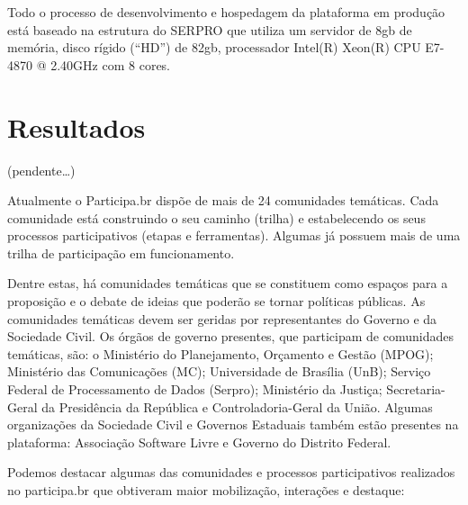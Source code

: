 \documentclass{article}
\begin{document}
Todo o processo de desenvolvimento e hospedagem da plataforma em produção
está  baseado na estrutura do SERPRO que utiliza um servidor de 8gb de
memória, disco rígido (``HD'') de 82gb, processador Intel(R) Xeon(R) CPU E7-
4870 @ 2.40GHz com 8 cores.
 
\section{Resultados}

(pendente\ldots)


Atualmente o Participa.br dispõe de mais de 24 comunidades temáticas. Cada
comunidade está construindo o seu caminho (trilha) e estabelecendo os seus
processos participativos (etapas e ferramentas). Algumas já possuem mais de uma
trilha de participação em funcionamento.

Dentre estas, há comunidades temáticas que se constituem como espaços para a
proposição e o debate de ideias que poderão se tornar políticas públicas. As
comunidades temáticas devem ser geridas por representantes do Governo e da
Sociedade Civil. Os órgãos de governo presentes, que participam de comunidades
temáticas, são: o  Ministério do Planejamento, Orçamento e Gestão (MPOG);
Ministério das Comunicações (MC); Universidade de Brasília (UnB); Serviço
Federal de Processamento de Dados (Serpro); Ministério da Justiça;
Secretaria-Geral da Presidência da República e Controladoria-Geral da União.
Algumas organizações da Sociedade Civil e Governos Estaduais também estão
presentes na plataforma: Associação Software Livre e Governo do Distrito
Federal.

Podemos destacar algumas das comunidades e processos participativos realizados
no participa.br que obtiveram maior mobilização, interações e destaque:
\end{document}
